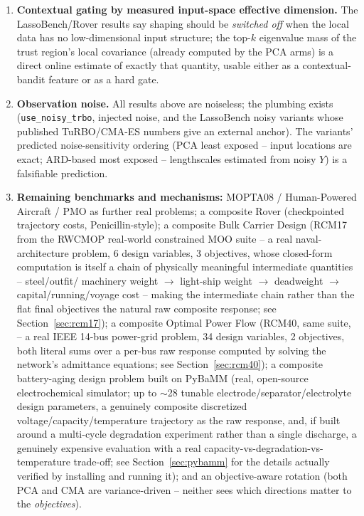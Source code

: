 \documentclass[11pt]{article}
\begin{document}
\begin{enumerate}
likelihood). Adaptivity is free when reward signal exists, and impossible
when it does not.
\item \textbf{Contextual gating by measured input-space effective
dimension.} The LassoBench/Rover results say shaping should be
\emph{switched off} when the local data has no low-dimensional input
structure; the top-$k$ eigenvalue mass of the trust region's local
covariance (already computed by the PCA arms) is a direct online estimate
of exactly that quantity, usable either as a contextual-bandit feature or
as a hard gate.
\item \textbf{Observation noise.} All results above are noiseless; the
plumbing exists (\texttt{use\_noisy\_trbo}, injected noise, and the
LassoBench noisy variants whose published TuRBO/CMA-ES numbers give an
external anchor). The variants' predicted noise-sensitivity ordering
(PCA least exposed -- input locations are exact; ARD-based most exposed --
lengthscales estimated from noisy $Y$) is a falsifiable prediction.
\item \textbf{Remaining benchmarks and mechanisms:} MOPTA08 /
Human-Powered Aircraft / PMO as further real problems; a composite Rover
(checkpointed trajectory costs, Penicillin-style); a composite Bulk
Carrier Design (RCM17 from the RWCMOP real-world constrained MOO suite
\citep{kumar2021rwcmop} -- a real naval-architecture problem, 6 design
variables, 3 objectives, whose closed-form computation is itself a chain
of physically meaningful intermediate quantities -- steel/outfit/
machinery weight $\to$ light-ship weight $\to$ deadweight $\to$
capital/running/voyage cost -- making the intermediate chain rather than
the flat final objectives the natural raw composite response; see
Section~\ref{sec:rcm17}); a composite Optimal Power Flow (RCM40, same
suite, \citep{biswas2020opf} -- a real IEEE 14-bus power-grid problem, 34
design variables, 2 objectives, both literal sums over a per-bus raw
response computed by solving the network's admittance equations; see
Section~\ref{sec:rcm40}); a composite battery-aging design problem built
on PyBaMM \citep{sulzer2021pybamm} (real, open-source electrochemical
simulator; up to $\sim$28 tunable electrode/separator/electrolyte design
parameters, a genuinely composite discretized voltage/capacity/temperature
trajectory as the raw response, and, if built around a multi-cycle
degradation experiment rather than a single discharge, a genuinely
expensive evaluation with a real capacity-vs-degradation-vs-temperature
trade-off; see Section~\ref{sec:pybamm} for the details actually verified
by installing and running it); and an objective-aware rotation (both PCA and
CMA are variance-driven -- neither sees which directions matter to the
\emph{objectives}).
\end{enumerate}
\end{document}
